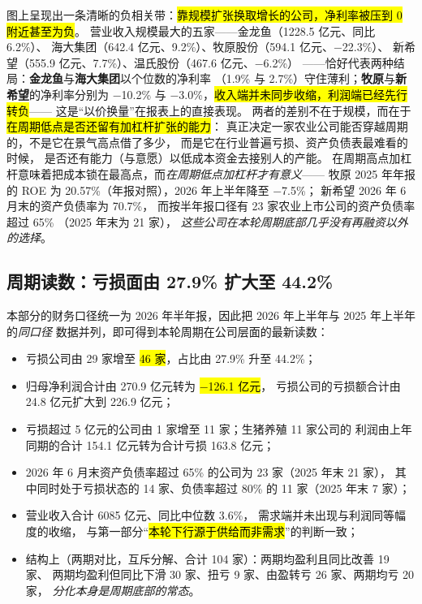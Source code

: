 图上呈现出一条清晰的负相关带：\hl{靠规模扩张换取增长的公司，净利率被压到 0 附近甚至为负}。
营业收入规模最大的五家——金龙鱼（\num{1228.5} 亿元、同比 \num{+6.2}\%）、
海大集团（\num{642.4} 亿元、\num{+9.2}\%）、牧原股份（\num{594.1} 亿元、\num{-22.3}\%）、
新希望（\num{555.9} 亿元、\num{+7.7}\%）、温氏股份（\num{467.6} 亿元、\num{-6.2}\%）
——恰好代表两种结局：\textbf{金龙鱼}与\textbf{海大集团}以个位数的净利率
（\num{1.9}\% 与 \num{2.7}\%）守住薄利；\textbf{牧原}与\textbf{新希望}的净利率分别为
\num{-10.2}\% 与 \num{-3.0}\%，\hl{收入端并未同步收缩，利润端已经先行转负}——
这是“以价换量”在报表上的直接表现。
两者的差别不在于规模，而在于\hl{在周期低点是否还留有加杠杆扩张的能力}：
真正决定一家农业公司能否穿越周期的，不是它在景气高点借了多少，
而是它在行业普遍亏损、资产负债表最难看的时候，
是否还有能力（与意愿）以低成本资金去接别人的产能。
在周期高点加杠杆意味着把成本锁在最高点，而\emph{在周期低点加杠杆才有意义}——
牧原 2025 年年报的 ROE 为 \num{20.57}\%（年报对照），2026 年上半年降至 \num{-7.5}\%；
新希望 2026 年 6 月末的资产负债率为 \num{70.7}\%，
而按半年报口径有 \num{23} 家农业上市公司的资产负债率超过 \num{65}\%
（2025 年末为 \num{21} 家），
\emph{这些公司在本轮周期底部几乎没有再融资以外的选择}。

\subsection{周期读数：亏损面由 27.9\% 扩大至 44.2\%}
\label{sec:comp-h1}

本部分的财务口径统一为 2026 年半年报，因此把 2026 年上半年与 2025 年上半年的\emph{同口径}
数据并列，即可得到本轮周期在公司层面的最新读数：

\begin{itemize}[leftmargin=1.4em, itemsep=2pt]
  \item 亏损公司由 \num{29} 家增至 \hl{\num{46} 家}，占比由 \num{27.9}\% 升至 \num{44.2}\%；
  \item 归母净利润合计由 \num{270.9} 亿元转为 \hl{\num{-126.1} 亿元}，
        亏损公司的亏损额合计由 \num{24.8} 亿元扩大到 \num{226.9} 亿元；
  \item 亏损超过 \num{5} 亿元的公司由 \num{1} 家增至 \num{11} 家；生猪养殖 \num{11} 家公司的
        利润由上年同期的合计 \num{154.1} 亿元转为合计亏损 \num{163.8} 亿元；
  \item 2026 年 6 月末资产负债率超过 \num{65}\% 的公司为 \num{23} 家（2025 年末 \num{21} 家），
        其中同时处于亏损状态的 \num{14} 家、负债率超过 \num{80}\% 的 \num{11} 家（2025 年末 \num{7} 家）；
  \item 营业收入合计 \num{6085} 亿元、同比中位数 \num{+3.6}\%，
        需求端并未出现与利润同等幅度的收缩，
        与第一部分“\hl{本轮下行源于供给而非需求}”的判断一致；
  \item 结构上（两期对比，互斥分解、合计 \num{104} 家）：两期均盈利且同比改善 \num{19} 家、
        两期均盈利但同比下滑 \num{30} 家、扭亏 \num{9} 家、由盈转亏 \num{26} 家、两期均亏 \num{20} 家，
        \emph{分化本身是周期底部的常态}。
\end{itemize}

